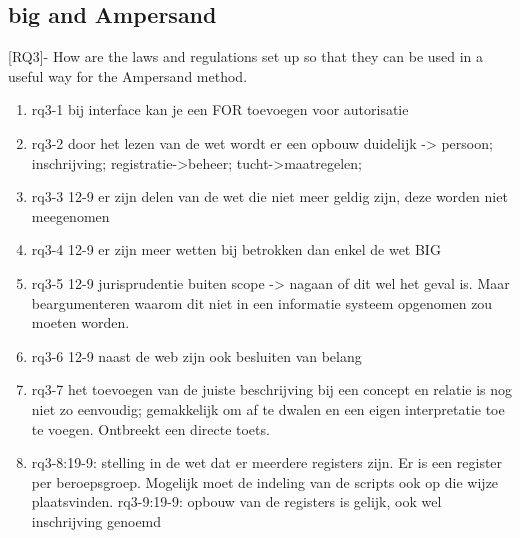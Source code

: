 \subsection{\acrlong{big} and Ampersand}
[RQ3]- How are the laws and regulations set up so that they can be used in a useful way for the Ampersand method.
\begin{enumerate}
    \item rq3-1 bij interface kan je een FOR toevoegen voor autorisatie
    \item rq3-2 door het lezen van de wet wordt er een opbouw duidelijk -> persoon; inschrijving; registratie->beheer; tucht->maatregelen; 
    \item rq3-3 12-9 er zijn delen van de wet die niet meer geldig zijn, deze worden niet meegenomen
    \item rq3-4 12-9 er zijn meer wetten bij betrokken dan enkel de wet BIG
    \item rq3-5 12-9 jurisprudentie buiten scope -> nagaan of dit wel het geval is. Maar beargumenteren waarom dit niet in een informatie systeem opgenomen zou moeten worden.
    \item rq3-6 12-9 naast de web zijn ook besluiten van belang
    \item rq3-7 het toevoegen van de juiste beschrijving bij een concept en relatie is nog niet zo eenvoudig; gemakkelijk om af te dwalen en een eigen interpretatie toe te voegen. Ontbreekt een directe toets.
    \item rq3-8:19-9: stelling in de wet dat er meerdere registers zijn. Er is een register per beroepsgroep. Mogelijk moet de indeling van de scripts ook op die wijze plaatsvinden.
    \itme rq3-9:19-9: opbouw van de registers is gelijk, ook wel inschrijving genoemd
\end{enumerate}